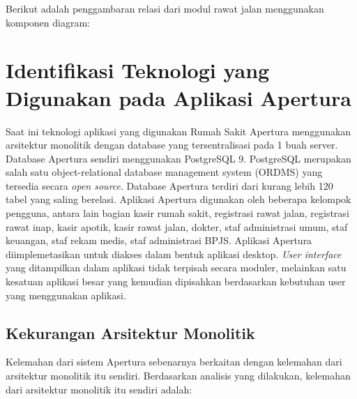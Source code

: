 Berikut adalah penggambaran relasi dari modul rawat jalan menggunakan komponen diagram:

\begin{adjustbox}{width=1\textwidth}
	\begin{minipage}{\linewidth}
	\end{minipage}
\end{adjustbox}

\section{Identifikasi Teknologi yang Digunakan pada Aplikasi Apertura}
Saat ini teknologi aplikasi yang digunakan Rumah Sakit Apertura menggunakan arsitektur monolitik dengan database yang tersentralisasi pada 1 buah server. Database Apertura sendiri menggunakan PostgreSQL 9. PostgreSQL merupakan salah satu object-relational database management system (ORDMS) yang tersedia secara \textit{open source}. Database Apertura terdiri dari kurang lebih 120 tabel yang saling berelasi. Aplikasi Apertura digunakan oleh beberapa kelompok pengguna, antara lain bagian kasir rumah sakit, registrasi rawat jalan, registrasi rawat inap, kasir apotik, kasir rawat jalan, dokter, staf administrasi umum, staf keuangan, staf rekam medis, staf administrasi BPJS.
Aplikasi Apertura diimplemetasikan untuk diakses dalam bentuk aplikasi desktop. \textit{User interface} yang ditampilkan dalam aplikasi tidak terpisah secara moduler, melainkan satu kesatuan aplikasi besar yang kemudian dipisahkan berdasarkan kebutuhan user yang menggunakan aplikasi.

\subsection{Kekurangan Arsitektur Monolitik}
Kelemahan dari sistem Apertura sebenarnya berkaitan dengan kelemahan dari arsitektur monolitik itu sendiri. Berdasarkan analisis yang dilakukan, kelemahan dari arsitektur monolitik itu sendiri adalah:

